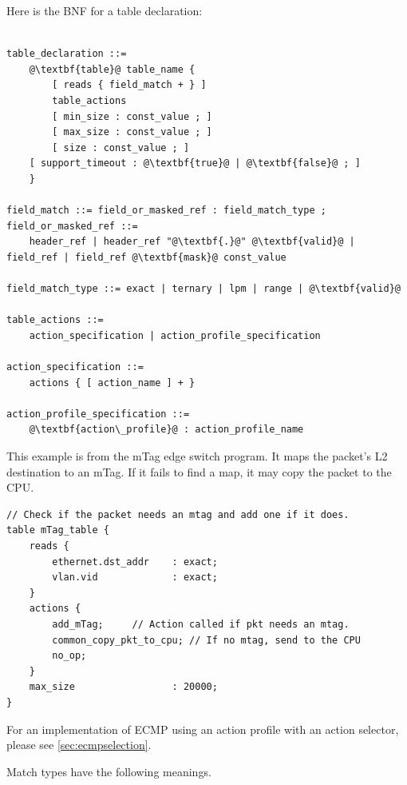 \documentclass[12pt]{article}
\begin{document}
Here is the BNF for a table declaration:

\begin{lstlisting}[frame=single,backgroundcolor=\color{bnfgreen},escapechar=\@]

table_declaration ::=
    @\textbf{table}@ table_name {
        [ reads { field_match + } ]
        table_actions
        [ min_size : const_value ; ]
        [ max_size : const_value ; ]
        [ size : const_value ; ]
	[ support_timeout : @\textbf{true}@ | @\textbf{false}@ ; ]
    }

field_match ::= field_or_masked_ref : field_match_type ;
field_or_masked_ref ::= 
    header_ref | header_ref "@\textbf{.}@" @\textbf{valid}@ | field_ref | field_ref @\textbf{mask}@ const_value

field_match_type ::= exact | ternary | lpm | range | @\textbf{valid}@

table_actions ::= 
    action_specification | action_profile_specification

action_specification ::= 
    actions { [ action_name ] + }

action_profile_specification ::= 
    @\textbf{action\_profile}@ : action_profile_name

\end{lstlisting}

This example is from the mTag edge switch program.  It maps the packet's 
L2 destination to an mTag. If it fails to find a map, it may copy the packet 
to the CPU.

\begin{lstlisting}[keywords={},frame=single,escapechar=\@]
// Check if the packet needs an mtag and add one if it does.
table mTag_table {
    reads {
        ethernet.dst_addr    : exact;
        vlan.vid             : exact;
    }
    actions {
        add_mTag;     // Action called if pkt needs an mtag.
        common_copy_pkt_to_cpu; // If no mtag, send to the CPU
        no_op;
    }
    max_size                 : 20000;
}
\end{lstlisting}

For an implementation of ECMP using an action profile with an action selector,
please see \ref{sec:ecmpselection}.


Match types have the following meanings.
\end{document}
